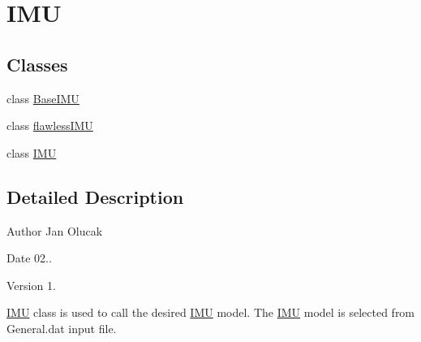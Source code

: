 \hypertarget{group___i_m_u}{}\section{I\+MU}
\label{group___i_m_u}
\subsection*{Classes}
\begin{DoxyCompactItemize}
\item 
class \hyperlink{class_base_i_m_u}{Base\+I\+MU}
\item 
class \hyperlink{classflawless_i_m_u}{flawless\+I\+MU}
\item 
class \hyperlink{class_i_m_u}{I\+MU}
\end{DoxyCompactItemize}


\subsection{Detailed Description}
\begin{DoxyAuthor}{Author}
Jan Olucak 
\end{DoxyAuthor}
\begin{DoxyDate}{Date}
02.. 
\end{DoxyDate}
\begin{DoxyVersion}{Version}
1.
\end{DoxyVersion}
\hyperlink{class_i_m_u}{I\+MU} class is used to call the desired \hyperlink{class_i_m_u}{I\+MU} model. The \hyperlink{class_i_m_u}{I\+MU} model is selected from General.\+dat input file. 